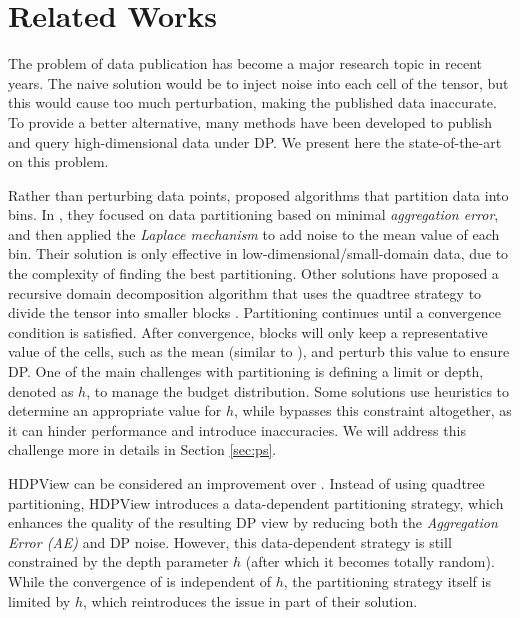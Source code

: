 \section{Related Works}
\label{sec:rw}
The problem of data publication has become a major research topic in recent years. The naive solution would be to inject noise into each cell of the \cite{iden,winslett} tensor, but this would cause too much perturbation, making the published data inaccurate. 
To provide a better alternative, many methods have been developed to publish and query high-dimensional data under DP. We present here the state-of-the-art on this problem.\medskip

Rather than perturbing data points, \cite{ahp,dawa} proposed algorithms that partition data into bins. In \cite{dawa}, they focused on data partitioning based on minimal \textit{aggregation error}, and then applied the \textit{Laplace mechanism} to add noise to the mean value of each bin. Their solution is only effective in low-dimensional/small-domain data, due to the complexity of finding the best partitioning. 
Other solutions have proposed a recursive domain decomposition algorithm that uses the quadtree strategy to divide the tensor into smaller blocks \cite{privtree,14}. 
Partitioning continues until a convergence condition is satisfied. After convergence, blocks will only keep a representative value of the cells, such as the mean (similar to \cite{dawa}), and perturb this value to ensure DP. 
One of the main challenges with partitioning is defining a limit or depth, denoted as $h$, to manage the budget distribution. Some solutions \cite{cormode,depth1,depth2} use heuristics to determine an appropriate value for $h$, while \cite{privtree} bypasses this constraint altogether, as it can hinder performance and introduce inaccuracies. We will address this challenge more in details in Section \ref{sec:ps}.

HDPView \cite{hdpview} can be considered an improvement over \cite{privtree}. Instead of using quadtree partitioning, HDPView introduces a data-dependent partitioning strategy, which enhances the quality of the resulting DP view by reducing both the \textit{Aggregation Error (AE)} and DP noise. However, this data-dependent strategy is still constrained by the depth parameter $h$ (after which it becomes totally random). While the convergence of \cite{hdpview} is independent of $h$, the partitioning strategy itself is limited by $h$, which reintroduces the issue in part of their solution.

